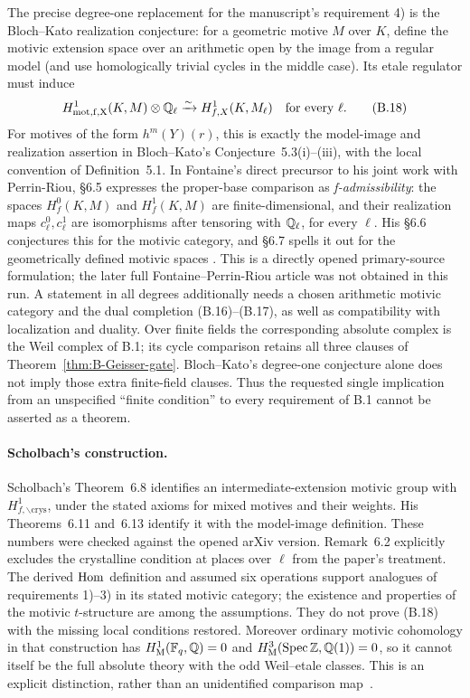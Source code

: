 The precise degree-one replacement for the manuscript's requirement
4) is the Bloch--Kato realization conjecture: for a geometric motive
\(M\) over \(K\), define the motivic extension space over an
arithmetic open by the image from a regular model (and use
homologically trivial cycles in the middle case).  Its etale regulator
must induce
\[
 H^1_{\rm mot,f,X}(K,M)\otimes\mathbb Q_\ell
 \xrightarrow{\sim}H^1_{f,X}(K,M_\ell)\quad\text{for every }\ell.
 \tag{B.18}
\]
For motives of the form \(h^m(Y)(r)\), this is exactly the
model-image and realization assertion in Bloch--Kato's
Conjecture~5.3(i)--(iii), with the local convention of Definition~5.1.
In Fontaine's direct precursor to his joint work with Perrin-Riou,
\S6.5 expresses the proper-base comparison as \emph{f-admissibility}:
the spaces \(H_f^0(K,M)\) and \(H_f^1(K,M)\) are finite-dimensional,
and their realization maps \(c^0_\ell,c^1_\ell\) are isomorphisms
after tensoring with \(\mathbb Q_\ell\), for every \(\ell\).
His \S6.6 conjectures this for the motivic category, and \S6.7
spells it out for the geometrically defined motivic spaces
\cite[pp.~221--223]{BFontaine1992}.  This is a directly opened
primary-source formulation; the later full Fontaine--Perrin-Riou
article was not obtained in this run.
A statement in all degrees additionally needs a chosen arithmetic
motivic category and the dual completion (B.16)--(B.17), as well as
compatibility with localization and duality.  Over finite fields the
corresponding absolute complex is the Weil complex of B.1; its cycle
comparison retains all three clauses of Theorem~\ref{thm:B-Geisser-gate}.
Bloch--Kato's degree-one conjecture alone does not imply those extra
finite-field clauses.  Thus the requested single implication from
an unspecified ``finite condition'' to every requirement of B.1
cannot be asserted as a theorem.

\paragraph{Scholbach's construction.}
Scholbach's Theorem~6.8 identifies an intermediate-extension motivic
group with \(H^1_{f,\backslash\mathrm{crys}}\), under the stated
axioms for mixed motives and their weights.  His Theorems~6.11 and~6.13
identify it with the model-image definition.  These numbers were
checked against the opened arXiv version.  Remark~6.2 explicitly
excludes the crystalline condition at places over \(\ell\) from the
paper's treatment.  The derived \(\operatorname{Hom}\) definition and assumed six
operations support analogues of requirements 1)--3) in its stated
motivic category; the existence and properties of the motivic
\(t\)-structure are among the assumptions.  They do not prove (B.18)
with the missing local conditions restored.  Moreover ordinary
motivic cohomology in that construction has
\(H^1_{\mathrm M}(\mathbb F_q,\mathbb Q)=0\) and
\(H^3_{\mathrm M}(\operatorname{Spec}\mathbb Z,\mathbb Q(1))=0\), so it cannot itself be the
full absolute theory with the odd Weil--etale classes.  This is an
explicit distinction, rather than an unidentified comparison
map~\cite[Remark~6.2 and Theorems~6.8, 6.11, 6.13]{BScholbach2015}.

